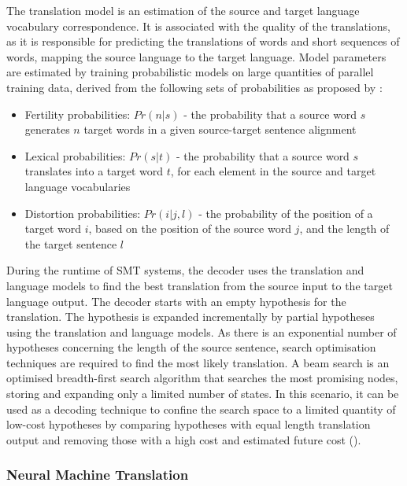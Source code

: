 The translation model is an estimation of the source and target language vocabulary correspondence. It is associated with the quality of the translations, as it is responsible for predicting the translations of words and short sequences of words, mapping the source language to the target language. Model parameters are estimated by training probabilistic models on large quantities of parallel training data, derived from the following sets of probabilities as proposed by \cite{brown_statistical_1990}:
\begin{itemize}
    \item Fertility probabilities:  $Pr(n|s)$ - the probability that a source word $s$ generates $n$ target words in a given source-target sentence alignment
    
    \item Lexical probabilities: $Pr(s|t)$ - the probability that a source word $s$ translates into a target word $t$, for each element in the source and target language vocabularies
    
    \item Distortion probabilities: $Pr(i|j, l)$ - the probability of the position of a target word $i$, based on the position of the source word $j$, and the length of the target sentence $l$
\end{itemize}

During the runtime of \acrshort{SMT} systems, the decoder uses the translation and language models to find the best translation from the source input to the target language output. 
The decoder starts with an empty hypothesis for the translation. The hypothesis is expanded incrementally by partial hypotheses using the translation and language models. As there is an exponential number of hypotheses concerning the length of the source sentence, search optimisation techniques are required to find the most likely translation. A beam search is an optimised breadth-first search algorithm that searches the most promising nodes, storing and expanding only a limited number of states. In this scenario, it can be used as a decoding technique to confine the search space to a limited quantity of low-cost hypotheses by comparing hypotheses with equal length translation output and removing those with a high cost and estimated future cost (\cite{koehn_pharaoh_2004}).

\subsubsection{Neural Machine Translation}

